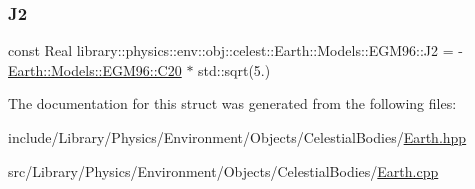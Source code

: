 \subsubsection{\texorpdfstring{J2}{J2}}
{\footnotesize\ttfamily const Real library\+::physics\+::env\+::obj\+::celest\+::\+Earth\+::\+Models\+::\+E\+G\+M96\+::\+J2 = -\/\hyperlink{structlibrary_1_1physics_1_1env_1_1obj_1_1celest_1_1_earth_1_1_models_1_1_e_g_m96_a37ac9f9643bf74cc47fa23b102cecf34}{Earth\+::\+Models\+::\+E\+G\+M96\+::\+C20} $\ast$ std\+::sqrt(5.)\hspace{0.3cm}{\ttfamily [static]}}



The documentation for this struct was generated from the following files\+:\begin{DoxyCompactItemize}
\item 
include/\+Library/\+Physics/\+Environment/\+Objects/\+Celestial\+Bodies/\hyperlink{_objects_2_celestial_bodies_2_earth_8hpp}{Earth.\+hpp}\item 
src/\+Library/\+Physics/\+Environment/\+Objects/\+Celestial\+Bodies/\hyperlink{_objects_2_celestial_bodies_2_earth_8cpp}{Earth.\+cpp}\end{DoxyCompactItemize}
